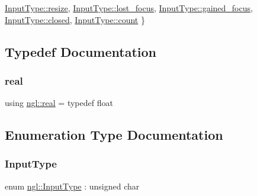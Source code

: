 \begin{DoxyCompactItemize}
\newline
\mbox{\hyperlink{namespacengl_a5b20ff50635da5e3adb6bec00c062497adc3d3b1a336fbbd51585e31c95f45c83}{Input\+Type\+::resize}}, 
\mbox{\hyperlink{namespacengl_a5b20ff50635da5e3adb6bec00c062497ac3e76686badae4b6d625c39e41b23521}{Input\+Type\+::lost\+\_\+focus}}, 
\mbox{\hyperlink{namespacengl_a5b20ff50635da5e3adb6bec00c062497a4a46fc9d3e3456efe6a3980f2f3fbcc0}{Input\+Type\+::gained\+\_\+focus}}, 
\mbox{\hyperlink{namespacengl_a5b20ff50635da5e3adb6bec00c062497a349e686330723975502e9ef4f939a5ac}{Input\+Type\+::closed}}, 
\newline
\mbox{\hyperlink{namespacengl_a5b20ff50635da5e3adb6bec00c062497ae2942a04780e223b215eb8b663cf5353}{Input\+Type\+::count}}
 \}
\end{DoxyCompactItemize}


\subsection{Typedef Documentation}
\mbox{\label{namespacengl_adada767537188ac7e090781732167146}} 
\subsubsection{\texorpdfstring{real}{real}}
{\footnotesize\ttfamily using \mbox{\hyperlink{namespacengl_adada767537188ac7e090781732167146}{ngl\+::real}} = typedef float}



\subsection{Enumeration Type Documentation}
\mbox{\label{namespacengl_a5b20ff50635da5e3adb6bec00c062497}} 
\subsubsection{\texorpdfstring{Input\+Type}{InputType}}
{\footnotesize\ttfamily enum \mbox{\hyperlink{namespacengl_a5b20ff50635da5e3adb6bec00c062497}{ngl\+::\+Input\+Type}} \+: unsigned char\hspace{0.3cm}{\ttfamily [strong]}}

